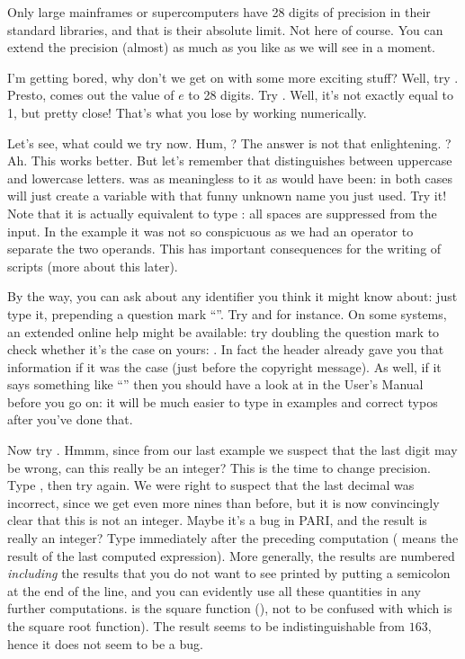 Only large mainframes or supercomputers have 28 digits of precision in their
standard libraries, and that is their absolute limit. Not here of course. You
can extend the precision (almost) as much as you like as we will see in a
moment.

I'm getting bored, why don't we get on with some more exciting stuff?  Well,
try . Presto, comes out the value of $e$ to 28 digits. Try
. Well, it's not exactly equal to 1, but pretty close!  That's
what you lose by working numerically.

Let's see, what could we try now. Hum, ? The answer is not that
enlightening. ? Ah. This works better. But let's remember that
distinguishes between uppercase and lowercase letters.  was as
meaningless to it as  would have been: in both cases
will just create a variable with that funny unknown name you just used. Try
it! Note that it is actually equivalent to type : all
spaces are suppressed from the input. In the  example  it was
not so conspicuous as we had an operator to separate the two operands. This
has important consequences for the writing of  scripts (more about this
later).

By the way, you can ask  about any identifier you think it might know
about: just type it, prepending a question mark ``''. Try 
and  for instance. On some systems, an extended online help might
be available: try doubling the question mark to check whether it's the case on
yours: . In fact the  header already gave you that information if
it was the case (just before the copyright message). As well, if it says
something like ``'' then you should have a look at
 in the User's Manual before you go on: it will be much
easier to type in examples and correct typos after you've done that.

Now try . Hmmm, since from our last example we
suspect that the last digit may be wrong, can this really be an integer?
This is the time to change precision. Type , then try
 again. We were right to suspect that the last
decimal was incorrect, since we get even more nines than before, but it is
now convincingly clear that this is not an integer. Maybe it's a bug in PARI,
and the result is really an integer? Type  immediately
after the preceding computation (\kbd{\%} means the result of the last
computed expression). More generally, the results are numbered
 {\it including} the results that you do not want to see
printed by putting a semicolon at the end of the line, and you can evidently
use all these quantities in any further computations.  is the square
function (), not to be confused with  which is
the square root function). The result seems to be indistinguishable from $163$,
hence it does not seem to be a bug.


